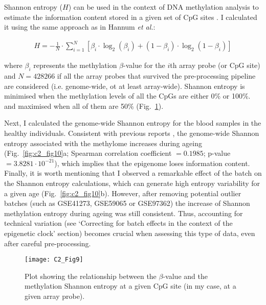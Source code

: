 \smallskip

Shannon entropy ($H$) can be used in the context of DNA methylation analysis to estimate the information content stored in a given set of CpG sites \cite{Slieker2016,Hannum2013,Wang2017,Xie2011,Jenkinson2017}. I calculated it using the same approach as in Hannum \textit{et al.}\cite{Hannum2013}:

\begin{align}
H = - \frac{1}{N} \cdot \sum_{i=1}^{N}[\beta_i \cdot \log_2(\beta_i) + (1-\beta_i) \cdot \log_2(1-\beta_i)]
\end{align}

where $\beta_i$ represents the methylation $\beta$-value for the $i$th array probe (or CpG site) and $N=428266$ if all the array probes that survived the pre-processing pipeline are considered (i.e. genome-wide, ot at least array-wide). Shannon entropy is minimised when the methylation levels of all the CpGs are either 0\% or 100\%. and maximised when all of them are 50\% (Fig.~\ref{fig:c2_fig9}).

\bigskip

Next, I calculated the genome-wide  Shannon entropy for the blood samples in the healthy individuals. Consistent with previous reports \cite{Slieker2016,Hannum2013,Wang2017,Jenkinson2017},  the genome-wide Shannon entropy associated with the methylome increases during ageing (Fig.~\ref{fig:c2_fig10}a; Spearman correlation coefficient $= 0.1985$; p-value $= 3.8281 \cdot 10^{-21}$), which implies that the epigenome loses information content. Finally, it is worth mentioning that I observed a remarkable effect of the batch on the Shannon entropy calculations, which can generate high entropy variability for a given age (Fig.~\ref{fig:c2_fig10}b). However, after removing potential outlier batches (such as GSE41273, GSE59065 or GSE97362) the increase of Shannon methylation entropy during ageing was still consistent. Thus, accounting for technical variation (see `Correcting for batch effects in the context of the epigenetic clock' section) becomes crucial when assessing this type of data, even after careful pre-processing. 

\begin{figure}[htbp!] 
	\centering
	\vspace*{3mm}    
	\texttt{[image: C2\_Fig9]}
	\caption[Relationship between the $\beta$-value and the Shannon entropy at a given CpG site]{Plot showing the relationship between the $\beta$-value and the methylation Shannon entropy at a given CpG site (in my case, at a given array probe).}
	\label{fig:c2_fig9}
\end{figure}

